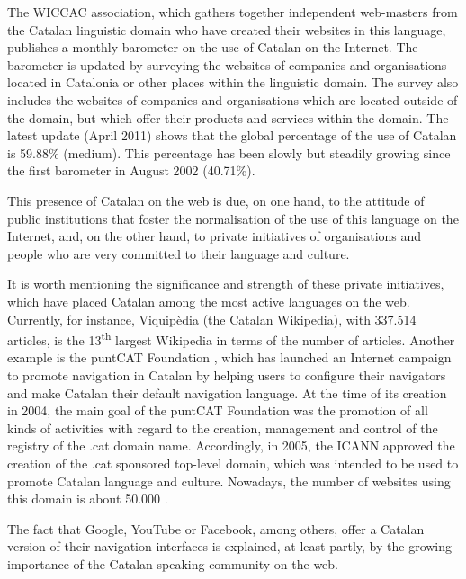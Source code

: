 \begin{multicols}{2}

The WICCAC \cite{CAT-Nota18} association, which gathers together independent web-masters from the Catalan linguistic domain who have created their websites in this language, publishes a monthly barometer on the use of Catalan on the Internet. The barometer is updated by surveying the websites of companies and organisations located in Catalonia or other places within the linguistic domain. The survey also includes the websites of companies and organisations which are located outside of the domain, but which offer their products and services within the domain. The latest update (April 2011) shows that the global percentage of the use of Catalan is 59.88\% (medium). This percentage has been slowly but steadily growing since the first barometer in August 2002 (40.71\%).

This presence of Catalan on the web is due, on one hand, to the attitude of public institutions that foster the normalisation of the use of this language on the Internet, and, on the other hand, to private initiatives of organisations and people who are very committed to their language and culture.

It is worth mentioning the significance and strength of these private initiatives, which have placed Catalan among the most active languages on the web. Currently, for instance, Viquipèdia (the Catalan Wikipedia), with 337.514 articles, is the 13\textsuperscript{th} largest Wikipedia in terms of the number of articles. Another example is the puntCAT Foundation \cite{CAT-Nota19}, which has launched an Internet campaign to promote navigation in Catalan by helping users to configure their navigators and make Catalan their default navigation language. At the time of its creation in 2004, the main goal of the puntCAT Foundation was the promotion of all kinds of activities with regard to the creation, management and control of the registry of the .cat domain name. Accordingly, in 2005, the ICANN approved the creation of the .cat sponsored top-level domain, which was intended to be used to promote Catalan language and culture. Nowadays, the number of websites using this domain is about 50.000 \cite{CAT-Nota20}.


The fact that Google, YouTube or Facebook, among others, offer a Catalan version of their navigation interfaces is explained, at least partly, by the growing importance of the Catalan-speaking community on the web.


\end{multicols}
